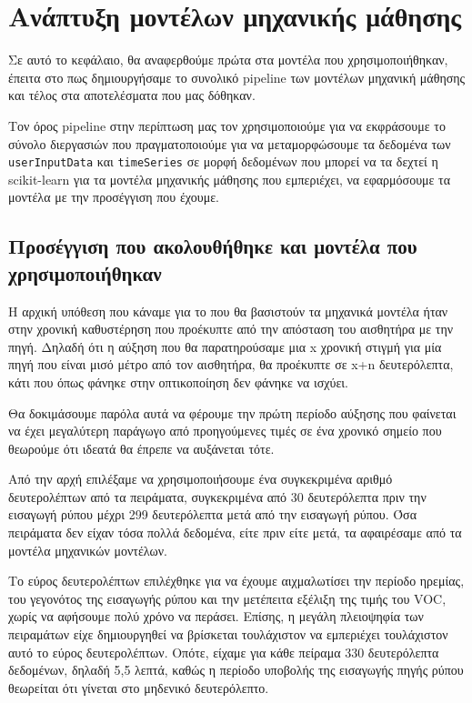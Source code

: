 \section{Ανάπτυξη  μοντέλων μηχανικής μάθησης}



Σε αυτό το κεφάλαιο, θα αναφερθούμε πρώτα στα μοντέλα που χρησιμοποιήθηκαν,
έπειτα στο πως δημιουργήσαμε το συνολικό pipeline των μοντέλων μηχανική μάθησης
και τέλος στα αποτελέσματα που μας δόθηκαν.

Τον όρος pipeline στην περίπτωση μας τον χρησιμοποιούμε για να εκφράσουμε το σύνολο διεργασιών που πραγματοποιούμε
για να μεταμορφώσουμε τα δεδομένα των \texttt{userInputData} και \texttt{timeSeries} 
σε μορφή δεδομένων που μπορεί να τα δεχτεί η scikit-learn για τα μοντέλα μηχανικής μάθησης που εμπεριέχει,
να εφαρμόσουμε τα μοντέλα με την προσέγγιση που έχουμε. 

\subsection{Προσέγγιση που ακολουθήθηκε και μοντέλα που χρησιμοποιήθηκαν}

Η αρχική υπόθεση που κάναμε για το που θα βασιστούν τα μηχανικά μοντέλα ήταν στην χρονική καθυστέρηση που προέκυπτε από
την απόσταση του αισθητήρα με την πηγή. 
Δηλαδή ότι η αύξηση που θα παρατηρούσαμε μια x χρονική στιγμή για μία πηγή που είναι μισό μέτρο από τον αισθητήρα, θα προέκυπτε 
σε x+n δευτερόλεπτα, κάτι που όπως φάνηκε στην οπτικοποίηση δεν φάνηκε να ισχύει.

Θα δοκιμάσουμε παρόλα αυτά να φέρουμε την πρώτη περίοδο αύξησης που φαίνεται να έχει μεγαλύτερη παράγωγο από προηγούμενες τιμές 
σε ένα χρονικό σημείο που θεωρούμε ότι ιδεατά θα έπρεπε να αυξάνεται τότε.

Από την αρχή επιλέξαμε να χρησιμοποιήσουμε ένα συγκεκριμένα αριθμό δευτερολέπτων από τα πειράματα,
συγκεκριμένα από 30 δευτερόλεπτα πριν την εισαγωγή ρύπου μέχρι 299 δευτερόλεπτα μετά από την εισαγωγή ρύπου.
Όσα πειράματα δεν είχαν τόσα πολλά δεδομένα, είτε πριν είτε μετά, τα αφαιρέσαμε από τα μοντέλα μηχανικών μοντέλων.

Το εύρος δευτερολέπτων  επιλέχθηκε για να έχουμε αιχμαλωτίσει την περίοδο ηρεμίας, του γεγονότος της εισαγωγής ρύπου 
και την μετέπειτα εξέλιξη της τιμής του VOC, χωρίς να αφήσουμε πολύ χρόνο να περάσει.
Επίσης, η μεγάλη πλειοψηφία των πειραμάτων είχε δημιουργηθεί να βρίσκεται τουλάχιστον να εμπεριέχει τουλάχιστον αυτό το εύρος δευτερολέπτων.
Οπότε, είχαμε για κάθε πείραμα 330 δευτερόλεπτα δεδομένων, δηλαδή 5,5 λεπτά, καθώς η περίοδο υποβολής της εισαγωγής πηγής ρύπου θεωρείται ότι 
γίνεται στο μηδενικό δευτερόλεπτο.

